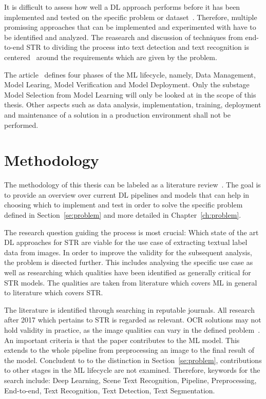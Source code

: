 It is difficult to assess how well a \ac{DL} approach performs before it has been
implemented and tested on the specific problem or dataset~\citep{arpteg_software_2018}.
Therefore, multiple promissing approaches that can be implemented and experimented with have to
be identified and analyzed.
The reasearch and discussion of techniques from end-to-end \ac{STR} to dividing the
process into text detection and text recognition is centered~\cite{chen_text_2021} around the
requirements which are given by the problem.

The article~\cite{ashmore_assuring_2021} defines four phases of the \ac{ML} lifecycle, namely,
Data Management, Model Learing, Model Verification and Model Deployment.
Only the substage Model Selection from Model Learning will only be looked at in the scope of this
thesis.
Other aspects such as data analysis, implementation, training, deployment and maintenance of a
solution in a production environment shall not be performed.

\section{Methodology}\label{se:methodology}
The methodology of this thesis can be labeled as a literature review~\citep{snyder_literature_2019,
torraco_writing_2005}.
The goal is to provide an overview over current \ac{DL} pipelines and models that can help in
choosing which to implement and test in order to solve the specific problem defined in
Section~\ref{se:problem} and more detailed in Chapter~\ref{ch:problem}.

The research question guiding the process is most crucial: Which state of the art \ac{DL}
approaches for \ac{STR} are viable for the use case of extracting textual label data from
images.
In order to improve the validity for the subsequent analysis, the problem is disected further.
This includes analysing the specific use case as well as researching which qualities have been
identified as generally critical for \ac{STR} models.
The qualities are taken from literature which covers \ac{ML} in general to literature
which covers \ac{STR}.

The literature is identified through searching in reputable journals.
All research after 2017 which pertains to \ac{STR} is regarded as relevant.
\ac{OCR} solutions may not hold validity in practice, as the image qualities can vary in the
defined problem~\citep{chen_text_2021}.
An important criteria is that the paper contributes to the \ac{ML} model.
This extends to the whole pipeline  from preprocessing an image to the final result of the model.
Concludent to to the distinction in Section~\ref{se:problem}, contributions to other stages in the
\ac{ML} lifecycle are not examined.
Therefore, keywords for the search include: Deep Learning, Scene Text Recognition, Pipeline,
Preprocessing, End-to-end, Text Recognition, Text Detection, Text Segmentation.

